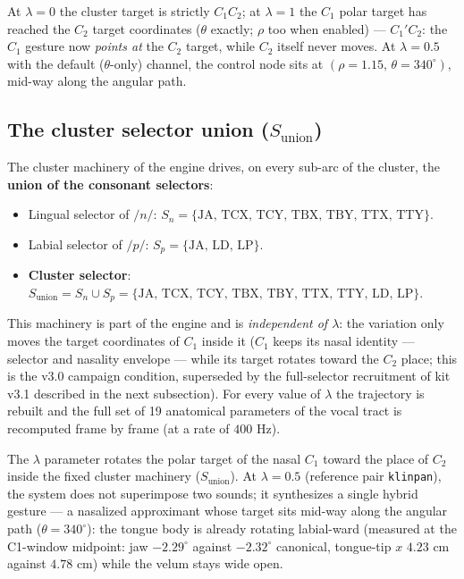 \documentclass[11pt,a4paper]{article}
\begin{document}
\noindent At $\lambda = 0$ the cluster target is strictly $C_1C_2$; at $\lambda = 1$ the $C_1$ polar target has reached the $C_2$ target coordinates ($\theta$ exactly; $\rho$ too when enabled) --- $C_1'C_2$: the $C_1$ gesture now \emph{points at} the $C_2$ target, while $C_2$ itself never moves. At $\lambda = 0.5$ with the default ($\theta$-only) channel, the control node sits at $(\rho = 1.15,\, \theta = 340^\circ)$, mid-way along the angular path.

\subsection{The cluster selector union ($S_{\text{union}}$)}
The cluster machinery of the engine drives, on every sub-arc of the cluster, the \textbf{union of the consonant selectors}:
\begin{itemize}[leftmargin=*]
    \item Lingual selector of $/n/$: $S_n = \{\text{JA, TCX, TCY, TBX, TBY, TTX, TTY}\}$.
    \item Labial selector of $/p/$: $S_p = \{\text{JA, LD, LP}\}$.
    \item \textbf{Cluster selector}: $S_{\text{union}} = S_n \cup S_p = \{\text{JA, TCX, TCY, TBX, TBY, TTX, TTY, LD, LP}\}$.
\end{itemize}

This machinery is part of the engine and is \emph{independent of $\lambda$}: the variation only moves the target coordinates of $C_1$ inside it ($C_1$ keeps its nasal identity --- selector and nasality envelope --- while its target rotates toward the $C_2$ place; this is the v3.0 campaign condition, superseded by the full-selector recruitment of kit v3.1 described in the next subsection). For every value of $\lambda$ the trajectory is rebuilt and the full set of 19 anatomical parameters of the vocal tract is recomputed frame by frame (at a rate of $400\text{ Hz}$).

\begin{summarybox}
The $\lambda$ parameter rotates the polar target of the nasal $C_1$ toward the place of $C_2$ inside the fixed cluster machinery ($S_{\text{union}}$). At $\lambda = 0.5$ (reference pair \texttt{klinpan}), the system does not superimpose two sounds; it synthesizes a single hybrid gesture --- a nasalized approximant whose target sits mid-way along the angular path ($\theta = 340^\circ$): the tongue body is already rotating labial-ward (measured at the C1-window midpoint: jaw $-2.29^\circ$ against $-2.32^\circ$ canonical, tongue-tip $x$ $4.23$ cm against $4.78$ cm) while the velum stays wide open.
\end{summarybox}
\end{document}
